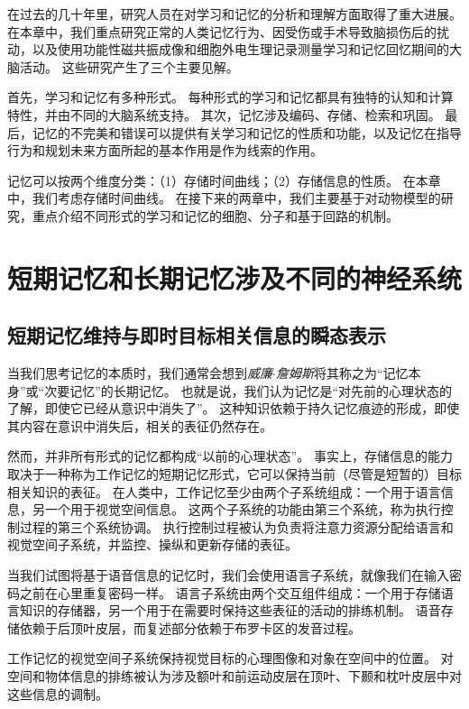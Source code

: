 在过去的几十年里，研究人员在对学习和记忆的分析和理解方面取得了重大进展。
在本章中，我们重点研究正常的人类记忆行为、因受伤或手术导致脑损伤后的扰动，以及使用功能性磁共振成像和细胞外电生理记录测量学习和记忆回忆期间的大脑活动。
这些研究产生了三个主要见解。


首先，学习和记忆有多种形式。
每种形式的学习和记忆都具有独特的认知和计算特性，并由不同的大脑系统支持。
其次，记忆涉及编码、存储、检索和巩固。
最后，记忆的不完美和错误可以提供有关学习和记忆的性质和功能，以及记忆在指导行为和规划未来方面所起的基本作用是作为线索的作用。


记忆可以按两个维度分类：（1）存储时间曲线；（2）存储信息的性质。
在本章中，我们考虑存储时间曲线。
在接下来的两章中，我们主要基于对动物模型的研究，重点介绍不同形式的学习和记忆的细胞、分子和基于回路的机制。



\section{短期记忆和长期记忆涉及不同的神经系统}

\subsection{短期记忆维持与即时目标相关信息的瞬态表示}

当我们思考记忆的本质时，我们通常会想到\textit{威廉$\cdot$詹姆斯}将其称之为“记忆本身”或“次要记忆”的长期记忆。
也就是说，我们认为记忆是“对先前的心理状态的了解，即使它已经从意识中消失了”。
这种知识依赖于持久记忆痕迹的形成，即使其内容在意识中消失后，相关的表征仍然存在。


然而，并非所有形式的记忆都构成“以前的心理状态”。
事实上，存储信息的能力取决于一种称为工作记忆的短期记忆形式，它可以保持当前（尽管是短暂的）目标相关知识的表征。
在人类中，工作记忆至少由两个子系统组成：一个用于语言信息，另一个用于视觉空间信息。
这两个子系统的功能由第三个系统，称为执行控制过程的第三个系统协调。
执行控制过程被认为负责将注意力资源分配给语言和视觉空间子系统，并监控、操纵和更新存储的表征。


当我们试图将基于语音信息的记忆时，我们会使用语言子系统，就像我们在输入密码之前在心里重复密码一样。
语言子系统由两个交互组件组成：一个用于存储语言知识的存储器，另一个用于在需要时保持这些表征的活动的排练机制。
语音存储依赖于后顶叶皮层，而复述部分依赖于布罗卡区的发音过程。


工作记忆的视觉空间子系统保持视觉目标的心理图像和对象在空间中的位置。
对空间和物体信息的排练被认为涉及额叶和前运动皮层在顶叶、下颞和枕叶皮层中对这些信息的调制。



